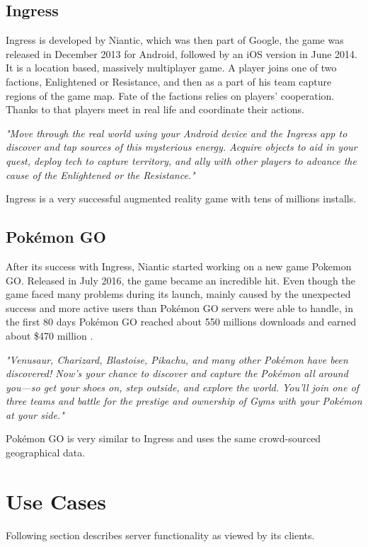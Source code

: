 	\subsection{Ingress}
	Ingress is developed by Niantic, which was then part of Google, the game was released in December 2013 for Android, followed by an iOS version in June 2014. It is a location based, massively multiplayer game. A player joins one of two factions, Enlightened or Resistance, and then as a part of his team capture regions of the game map. Fate of the factions relies on players’ cooperation. Thanks to that players meet in real life and coordinate their actions.
	
	\textit{"Move through the real world using your Android device and the Ingress app to discover and tap sources of this mysterious energy. Acquire objects to aid in your quest, deploy tech to capture territory, and ally with other players to advance the cause of the Enlightened or the Resistance."} \cite{ingress}
	
	Ingress is a very successful augmented reality game with tens of millions installs.
	
	\subsection{Pokémon GO}
	After its success with Ingress, Niantic started working on a new game Pokemon GO. Released in July 2016, the game became an incredible hit. Even though the game faced many problems during its launch, mainly caused by the unexpected success and more active users than Pokémon	GO servers were able to handle, in the first 80 days Pokémon GO reached about 550 millions downloads and earned about \$470 million \cite{pokemongosuccess}.
	
	\textit{"Venusaur, Charizard, Blastoise, Pikachu, and many other Pokémon have been discovered! Now’s your chance to discover and capture the Pokémon all around you—so get your shoes on, step outside, and explore the world. You’ll join one of three teams and battle for the prestige and ownership of Gyms with your Pokémon at your side."} \cite{pokemongo}
		
	Pokémon GO is very similar to Ingress and uses the same crowd-sourced geographical data.
	
\section{Use Cases}
Following section describes server functionality as viewed by its clients.

